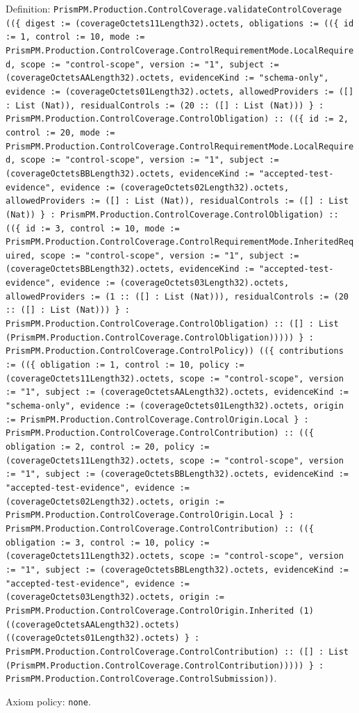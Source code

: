 \documentclass[11pt]{article}
\begin{document}
\noindent Definition: \texttt{PrismPM.Production.ControlCoverage.validateControlCoverage ((\{ digest := (coverageOctets11Length32).octets, obligations := ((\{ id := 1, control := 10, mode := PrismPM.Production.ControlCoverage.ControlRequirementMode.LocalRequired, scope := "control-scope", version := "1", subject := (coverageOctetsAALength32).octets, evidenceKind := "schema-only", evidence := (coverageOctets01Length32).octets, allowedProviders := ([] : List (Nat)), residualControls := (20 :: ([] : List (Nat))) \} : PrismPM.Production.ControlCoverage.ControlObligation) :: ((\{ id := 2, control := 20, mode := PrismPM.Production.ControlCoverage.ControlRequirementMode.LocalRequired, scope := "control-scope", version := "1", subject := (coverageOctetsBBLength32).octets, evidenceKind := "accepted-test-evidence", evidence := (coverageOctets02Length32).octets, allowedProviders := ([] : List (Nat)), residualControls := ([] : List (Nat)) \} : PrismPM.Production.ControlCoverage.ControlObligation) :: ((\{ id := 3, control := 10, mode := PrismPM.Production.ControlCoverage.ControlRequirementMode.InheritedRequired, scope := "control-scope", version := "1", subject := (coverageOctetsBBLength32).octets, evidenceKind := "accepted-test-evidence", evidence := (coverageOctets03Length32).octets, allowedProviders := (1 :: ([] : List (Nat))), residualControls := (20 :: ([] : List (Nat))) \} : PrismPM.Production.ControlCoverage.ControlObligation) :: ([] : List (PrismPM.Production.ControlCoverage.ControlObligation))))) \} : PrismPM.Production.ControlCoverage.ControlPolicy)) ((\{ contributions := ((\{ obligation := 1, control := 10, policy := (coverageOctets11Length32).octets, scope := "control-scope", version := "1", subject := (coverageOctetsAALength32).octets, evidenceKind := "schema-only", evidence := (coverageOctets01Length32).octets, origin := PrismPM.Production.ControlCoverage.ControlOrigin.Local \} : PrismPM.Production.ControlCoverage.ControlContribution) :: ((\{ obligation := 2, control := 20, policy := (coverageOctets11Length32).octets, scope := "control-scope", version := "1", subject := (coverageOctetsBBLength32).octets, evidenceKind := "accepted-test-evidence", evidence := (coverageOctets02Length32).octets, origin := PrismPM.Production.ControlCoverage.ControlOrigin.Local \} : PrismPM.Production.ControlCoverage.ControlContribution) :: ((\{ obligation := 3, control := 10, policy := (coverageOctets11Length32).octets, scope := "control-scope", version := "1", subject := (coverageOctetsBBLength32).octets, evidenceKind := "accepted-test-evidence", evidence := (coverageOctets03Length32).octets, origin := PrismPM.Production.ControlCoverage.ControlOrigin.Inherited (1) ((coverageOctetsAALength32).octets) ((coverageOctets01Length32).octets) \} : PrismPM.Production.ControlCoverage.ControlContribution) :: ([] : List (PrismPM.Production.ControlCoverage.ControlContribution))))) \} : PrismPM.Production.ControlCoverage.ControlSubmission))}.\par
\noindent Axiom policy: \texttt{none}.\par
\end{document}
